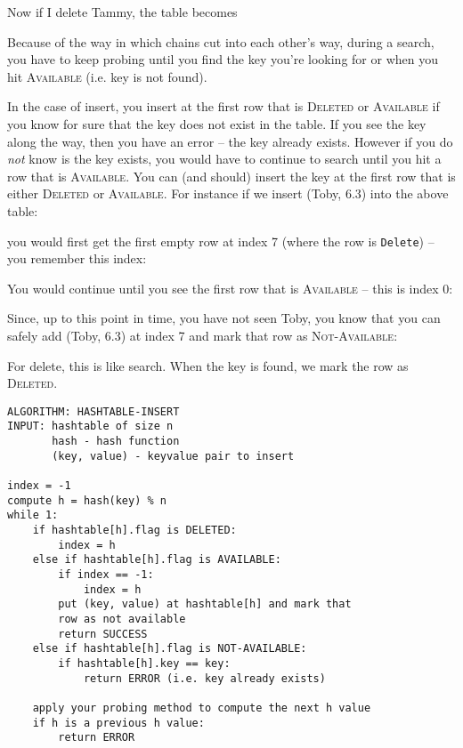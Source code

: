 Now if I delete Tammy, the table becomes


Because of the way in which chains cut into each other's way,
during a search, you have to keep probing until you find the key you're
looking for or when you hit \textsc{Available} (i.e. key is not found).

In the case of insert, you insert at the first row that is
\textsc{Deleted}
or
\textsc{Available}
if you know for sure that the key does not exist in the table.
If you see the key along the way, then you have an error -- the
key already exists.
However if you do \textit{not} know is the key exists,
you would have to continue to search until you hit a
row that is \textsc{Available}.
You can (and should) insert the key at the first row that is
either \textsc{Deleted} or \textsc{Available}.
For instance if we insert (Toby, 6.3) into the above table:

you would first get the first empty row at index 7 (where
the row is \texttt{Delete}) -- you remember this index:


You would continue until you see the first row that is \textsc{Available}
-- this is index 0:


Since, up to this point in time, you have not seen Toby, you know
that you can safely add (Toby, 6.3) at index 7 and mark that row
as \textsc{Not-Available}:


For delete, this is like search.
When the key is found, we mark the row as \textsc{Deleted}.



\begin{Verbatim}[frame=single]
ALGORITHM: HASHTABLE-INSERT
INPUT: hashtable of size n
       hash - hash function
       (key, value) - keyvalue pair to insert

index = -1
compute h = hash(key) % n
while 1:
    if hashtable[h].flag is DELETED:
        index = h
    else if hashtable[h].flag is AVAILABLE:
        if index == -1:
            index = h
        put (key, value) at hashtable[h] and mark that
        row as not available
        return SUCCESS
    else if hashtable[h].flag is NOT-AVAILABLE:
        if hashtable[h].key == key:
            return ERROR (i.e. key already exists)
    
    apply your probing method to compute the next h value
    if h is a previous h value:
        return ERROR
\end{Verbatim}

